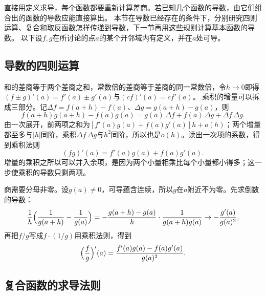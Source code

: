 直接用定义求导，每个函数都要重新计算差商。若已知几个函数的导数，由它们组合出的函数的导数应能直接算出。
本节在导数已经存在的条件下，分别研究四则运算、复合和取反函数怎样传递到导数，下一节再用这些规则计算基本函数的导数。
以下设$f,g$在所讨论的点$a$的某个开邻域内有定义，并在$a$处可导。

\subsection{导数的四则运算}
\label{sec:ru-derivative-arithmetic}

和的差商等于两个差商之和，常数倍的差商等于差商的同一常数倍，令$h\to0$即得$(f\pm g)'(a)=f'(a)\pm g'(a)$与$(cf)'(a)=cf'(a)$。
乘积的增量可以拆成三部分。记$\Delta f=f(a+h)-f(a)$、$\Delta g=g(a+h)-g(a)$，则
\[
 f(a+h)g(a+h)-f(a)g(a)=g(a)\,\Delta f+f(a)\,\Delta g+\Delta f\,\Delta g.
\]
由一次展开，前两项之和为$[f'(a)g(a)+f(a)g'(a)]h+o(h)$；两个增量都至多与$|h|$同阶，乘积$\Delta f\,\Delta g$与$h^2$同阶，所以也是$o(h)$。读出一次项的系数，得到乘积法则
\begin{equation}
 (fg)'(a)=f'(a)g(a)+f(a)g'(a).
 \label{eq:analysis-scalar-sum-product-rules}
\end{equation}
增量的乘积之所以可以并入余项，是因为两个小量相乘比每个小量都小得多；这一步使乘积的导数只剩两项。

商需要分母非零。设$g(a)\neq0$，可导蕴含连续，所以$g$在$a$附近不为零。先求倒数的导数：
\[
 \frac1h\Bigl(\frac1{g(a+h)}-\frac1{g(a)}\Bigr)=-\frac{g(a+h)-g(a)}h\cdot\frac1{g(a+h)g(a)}\to-\frac{g'(a)}{g(a)^2},
\]
再把$f/g$写成$f\cdot(1/g)$用乘积法则，得到
\[
 \Bigl(\frac fg\Bigr)'(a)=\frac{f'(a)g(a)-f(a)g'(a)}{g(a)^2}.
\]

\subsection{复合函数的求导法则}
\label{sec:ru-chain-rule}

